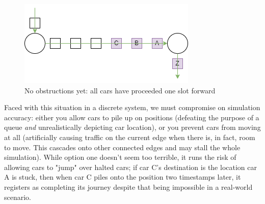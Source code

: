 \begin{figure}[H]
    \centering
	\includegraphics[width=0.75\linewidth]{tex files/Figures/BasicDiscrete.png}
	\caption[Discrete positions: blockade]{No obstructions yet:  all cars have proceeded one slot forward}
	\label{fig:BasicDiscrete}
\end{figure}


\par Faced with this situation in a discrete system, we must compromise on simulation accuracy:  either you allow cars to pile up on positions (defeating the purpose of a queue \textit{and} unrealistically depicting car location), or you prevent cars from moving at all (artificially causing traffic on the current edge when there is, in fact, room to move.  This cascades onto other connected edges and may stall the whole simulation).  While option one doesn't seem too terrible, it runs the risk of allowing cars to "jump" over halted cars; if car C's destination is the location car A is stuck, then when car C piles onto the position two timestamps later, it registers as completing its journey despite that being impossible in a real-world scenario.  \\

